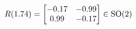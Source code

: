 \documentclass[preview]{standalone}
\begin{document}
\begin{align*}
\special{dvisvgm:raw <g id='unique000'>}R(1.74) = \begin{bmatrix} -0.17 & -0.99 \\ 0.99 & -0.17 \end{bmatrix} \in \text{SO}(2)\special{dvisvgm:raw </g>}
\end{align*}
\end{document}
